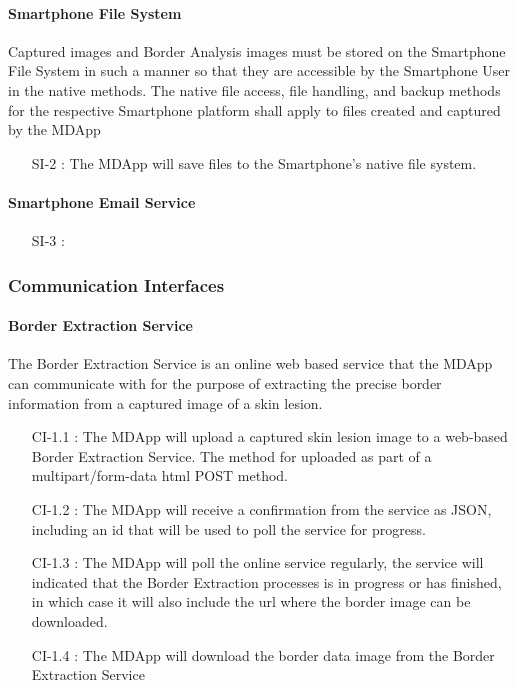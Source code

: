    \paragraph{Smartphone File System}

        Captured images and Border Analysis images must be stored on the Smartphone File System in such a manner so that they are accessible by the Smartphone User in the native methods. The native file access, file handling, and backup methods for the respective Smartphone platform shall apply to files created and captured by the MDApp

        \begin{itemize}[leftmargin=1.4cm]
            \item[SI-2 :] The MDApp will save files to the Smartphone's native file system.

        \end{itemize}

    \paragraph{Smartphone Email Service}

            \begin{itemize}[leftmargin=1.4cm]
            \item[SI-3 :]

        \end{itemize}

\subsubsection{Communication Interfaces}

    \paragraph{Border Extraction Service }

        The Border Extraction Service is an online web based service that the MDApp can communicate with for the purpose of extracting the precise border information from a captured image of a skin lesion.

        \begin{itemize}[leftmargin=1.4cm]
            \item[CI-1.1 :] The MDApp will upload a captured skin lesion image to a web-based Border Extraction Service. The method for uploaded as part of a multipart/form-data html POST method.
            \item[CI-1.2 :] The MDApp will receive a confirmation from the service as JSON, including an id that will be used to poll the service for progress.
            \item[CI-1.3 :] The MDApp will poll the online service regularly, the service will indicated that the Border Extraction processes is in progress or has finished, in which case it will also include the url where the border image can be downloaded.
            \item[CI-1.4 : ] The MDApp will download the border data image from the Border Extraction Service

        \end{itemize}

